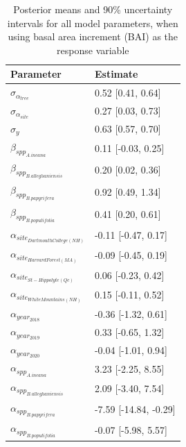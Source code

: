 \documentclass{article}\usepackage[]{graphicx}\usepackage[]{xcolor}
\begin{document}
\begin{table}[ht]
\centering
\caption{Posterior means and 90\% uncertainty intervals for all model parameters, when using basal area increment (BAI) as the response variable} 
\label{tab:BAItab}
\begin{tabular}{ll}
  \hline
Parameter & Estimate \\ 
  \hline
$\sigma_{\alpha_{tree}}$ & 0.52 [0.41, 0.64] \\ 
  $\sigma_{\alpha_{site}}$ & 0.27 [0.03, 0.73] \\ 
  $\sigma_{y}$ & 0.63 [0.57, 0.70] \\ 
  $\beta_{spp_{A. incana}}$ & 0.11 [-0.03, 0.25] \\ 
  $\beta_{spp_{B. alleghaniensis}}$ & 0.20 [0.02, 0.36] \\ 
  $\beta_{spp_{B. papyrifera}}$ & 0.92 [0.49, 1.34] \\ 
  $\beta_{spp_{B. populifolia}}$ & 0.41 [0.20, 0.61] \\ 
  $\alpha_{site_{Dartmouth College (NH)}}$ & -0.11 [-0.47, 0.17] \\ 
  $\alpha_{site_{Harvard Forest (MA)}}$ & -0.09 [-0.45, 0.19] \\ 
  $\alpha_{site_{St-Hippolyte (Qc)}}$ & 0.06 [-0.23, 0.42] \\ 
  $\alpha_{site_{White Mountains (NH)}}$ & 0.15 [-0.11, 0.52] \\ 
  $\alpha_{year_{2018}}$ & -0.36 [-1.32, 0.61] \\ 
  $\alpha_{year_{2019}}$ & 0.33 [-0.65, 1.32] \\ 
  $\alpha_{year_{2020}}$ & -0.04 [-1.01, 0.94] \\ 
  $\alpha_{spp_{A. incana}}$ & 3.23 [-2.25, 8.55] \\ 
  $\alpha_{spp_{B. alleghaniensis}}$ & 2.09 [-3.40, 7.54] \\ 
  $\alpha_{spp_{B. papyrifera}}$ & -7.59 [-14.84, -0.29] \\ 
  $\alpha_{spp_{B. populifolia}}$ & -0.07 [-5.98, 5.57] \\ 
   \hline
\end{tabular}
\end{table}
\end{document}
